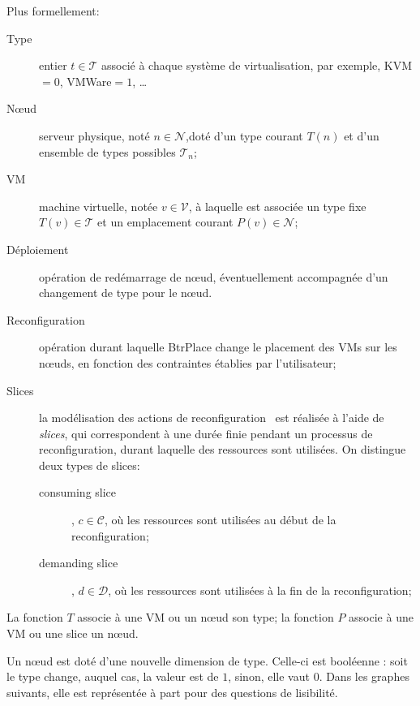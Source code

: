 \documentclass[a4paper]{article}
\begin{document}
Plus formellement:
\begin{description}
	\item[Type] entier $t \in \mathcal T$ associé à chaque système de virtualisation,
		par exemple, KVM$=0$, VMWare$=1$, \ldots
	\item[Nœud] serveur physique, noté $n \in \mathcal N$,doté d'un
		type courant $T(n)$ et d'un ensemble de types possibles
		$\mathcal{T}_n$;
	\item[VM] machine virtuelle, notée $v \in \mathcal V$, à laquelle
		est associée un type fixe $T(v) \in \mathcal T$ et un emplacement courant $P(v) \in \mathcal N$;
	\item[Déploiement] opération de redémarrage de nœud, éventuellement
		accompagnée d'un changement de type pour le nœud.
	\item[Reconfiguration] opération durant laquelle BtrPlace change le
		placement des VMs sur les nœuds, en fonction des contraintes
		établies par l'utilisateur;
	\item[Slices] la modélisation des actions de reconfiguration~\cite{herm2012}
		est réalisée à l'aide de \textit{slices}, qui correspondent à
		une durée finie pendant un processus de reconfiguration, durant laquelle
		des ressources sont utilisées. On distingue deux types de slices:
	\begin{description}
		\item[consuming slice], $c \in \mathcal C$, où les ressources sont
			utilisées au début de la reconfiguration;
		\item[demanding slice], $d \in \mathcal D$, où les ressources sont
		utilisées à la fin de la reconfiguration;
	\end{description}
\end{description}

La fonction $T$ associe à une VM ou un nœud son type; la fonction $P$
associe à une VM ou une slice un nœud.

Un nœud est doté d'une nouvelle dimension de type. Celle-ci
est booléenne : soit le type change, auquel cas, la valeur est de $1$,
sinon, elle vaut $0$. Dans les graphes suivants, elle est représentée
à part pour des questions de lisibilité.
\end{document}
